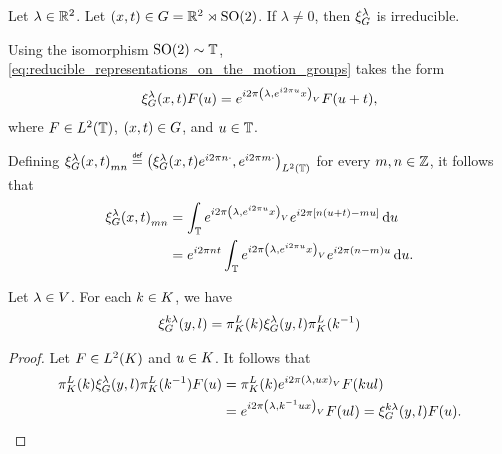 \begin{example}
    Let $\lambda \in \mathbb{R}^2$.
    Let $(x, t) \in G = \mathbb{R}^2 \rtimes {\mathrm{SO} (2)}$.
    If $\lambda \neq 0$, then $\xi^{\lambda}_{G}$ is irreducible.

    Using the isomorphism ${\mathrm{SO} (2)} \sim \mathbb{T}$,
    \eqref{eq:reducible_representations_on_the_motion_groups} takes the form
    \begin{align*}
        \xi^{\lambda}_{G}(x, t) F(u)
        = e^{i 2 \pi {\left(\lambda, e^{i2 \pi u} x\right)_{V}}} F(u + t),
    \end{align*}
    where $F \in {L^{2} (\mathbb{T})}$, $(x, t) \in G$, and $u \in \mathbb{T}$.

    Defining ${\Rep\lambda(x, t)}_{m n} \defeq \ip[\Lebesgue{2}\T]{\Rep\lambda(x, t) \e^{\i \turn n \dummy}}{\e^{\i \turn m \dummy}}$ for every $m, n \in \mathbb{Z}$,
    it follows that
    \begin{align*}
        {\xi^{\lambda}_{G}(x, t)}_{m n}
        &= \int_{\mathbb{T}} e^{i 2 \pi {\left(\lambda, e^{i2 \pi u} x\right)_{V}}} e^{i 2 \pi [n (u + t) - m u]} \,\mathrm{d} u\\
        &= e^{i 2 \pi n t} \int_{\mathbb{T}} e^{i 2 \pi {\left(\lambda, e^{i2 \pi u} x\right)_{V}}} e^{i 2 \pi (n - m)u} \,\mathrm{d} u.
    \end{align*}
\end{example}

\begin{lemma}
    Let $\lambda \in V$.
    For each $k \in K$, we have
    \begin{align*}
        \xi^{k \lambda}_{G}(y, l) = \pi^L_{K}(k) \xi^{\lambda}_{G}(y, l) \pi^L_{K}(k^{-1})
    \end{align*}
\end{lemma}
\begin{proof}
    Let $F \in {L^{2} (K)}$ and $u \in K$.
    It follows that
    \begin{align*}
        \pi^L_{K}(k) \xi^{\lambda}_{G}(y, l) \pi^L_{K}(k^{-1}) F(u)
        &= \pi^L_{K}(k) e^{i 2 \pi {\left(\lambda, u x\right)_{V}}} F(k u l)\\
        &= e^{i 2 \pi {\left(\lambda, k^{-1} u x\right)_{V}}} F(u l)
        = \xi^{k \lambda}_{G}(y, l) F(u).
    \end{align*}
\end{proof}

